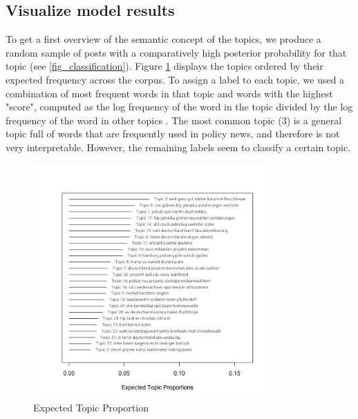 \documentclass[12pt,a4paper,notitlepage]{article}
\begin{document}
\subsection{Visualize model results}

To get a first overview of the semantic concept of the topics, we produce a random sample of posts with a comparatively high posterior probability for that topic (see \ref{fig_classification}). Figure \ref{fig_topic_proportion} displays the topics ordered by their expected frequency across the corpus. To assign a label to each topic, we used a combination of most frequent words in that topic and words with the highest "score", computed as the log frequency of the word in the topic divided by the log frequency of the word in other topics \citep{roberts_stm:_2016}. The most common topic (3) is a general topic full of words that are frequently used in policy news, and therefore is not very interpretable. However, the remaining labels seem to classify a certain topic.  

\begin{figure}[H]
	\begin{center}
	\includegraphics[width=0.8\textwidth,keepaspectratio]{../figs/topic_proportion.png}
	\caption{Expected Topic Proportion}
	\label{fig_topic_proportion}
	\end{center}
\end{figure}

\end{document}
